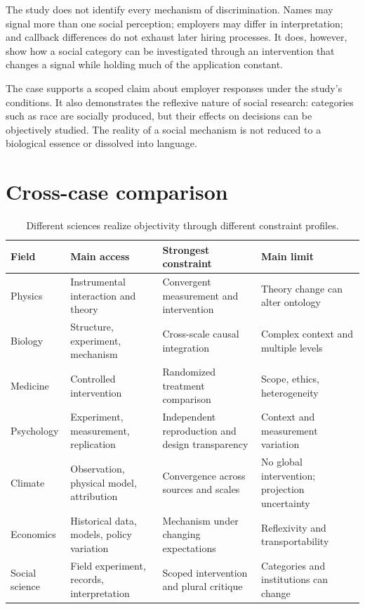 The study does not identify every mechanism of discrimination. Names may signal
more than one social perception; employers may differ in interpretation; and
callback differences do not exhaust later hiring processes. It does, however,
show how a social category can be investigated through an intervention that
changes a signal while holding much of the application constant.

The case supports a scoped claim about employer responses under the study's
conditions. It also demonstrates the reflexive nature of social research:
categories such as race are socially produced, but their effects on decisions
can be objectively studied. The reality of a social mechanism is not reduced
to a biological essence or dissolved into language.

\section{Cross-case comparison}

\begin{table}[ht]
\centering
\smalltable
\begin{tabularx}{\textwidth}{p{}p{}Y Y}
\toprule
Field & Main access & Strongest constraint & Main limit\\
\midrule
Physics & Instrumental interaction and theory & Convergent measurement and intervention & Theory change can alter ontology\\
Biology & Structure, experiment, mechanism & Cross-scale causal integration & Complex context and multiple levels\\
Medicine & Controlled intervention & Randomized treatment comparison & Scope, ethics, heterogeneity\\
Psychology & Experiment, measurement, replication & Independent reproduction and design transparency & Context and measurement variation\\
Climate & Observation, physical model, attribution & Convergence across sources and scales & No global intervention; projection uncertainty\\
Economics & Historical data, models, policy variation & Mechanism under changing expectations & Reflexivity and transportability\\
Social science & Field experiment, records, interpretation & Scoped intervention and plural critique & Categories and institutions can change\\
\bottomrule
\end{tabularx}
\caption{Different sciences realize objectivity through different constraint
profiles.}
\label{tab:case-comparison}
\end{table}

